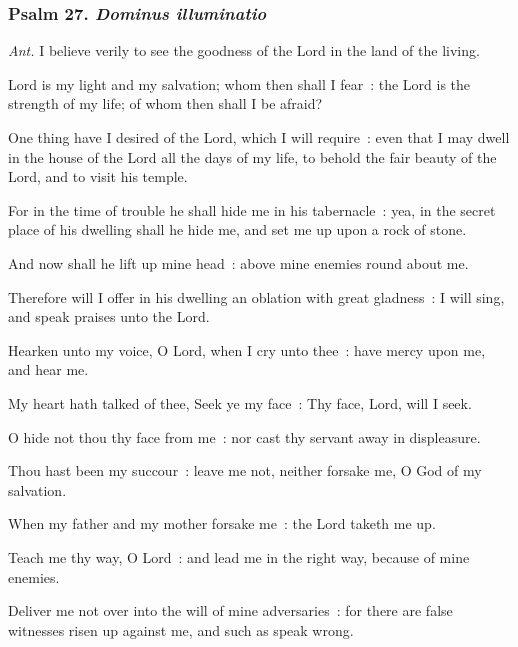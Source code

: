 \subsubsection{Psalm 27. \textit{Dominus illuminatio}}\par\noindent
\textit{Ant.} I believe {\dag} verily to see the goodness of the Lord in the land of the living.\par
{} Lord is my light and my salvation; whom then shall I fear~: the Lord is the strength of my life; of whom then shall I be afraid?\par
{}
One thing have I desired of the Lord, which I will require~: even that I may dwell in the house of the Lord all the days of my life, to behold the fair beauty of the Lord, and to visit his temple.\par
{}For in the time of trouble he shall hide me in his tabernacle~: yea, in the secret place of his dwelling shall he hide me, and set me up upon a rock of stone.\par
{}And now shall he lift up mine head~: above mine enemies round about me.\par
{}Therefore will I offer in his dwelling an oblation with great gladness~: I will sing, and speak praises unto the Lord.\par
{}Hearken unto my voice, O Lord, when I cry unto thee~: have mercy upon me, and hear me.\par
{}My heart hath talked of thee, Seek ye my face~: Thy face, Lord, will I seek.\par
{}O hide not thou thy face from me~: nor cast thy servant away in displeasure.\par
{}Thou hast been my succour~: leave me not, neither forsake me, O God of my salvation.\par
{}When my father and my mother forsake me~: the Lord taketh me up.\par
{}Teach me thy way, O Lord~: and lead me in the right way, because of mine enemies.\par
{}Deliver me not over into the will of mine adversaries~: for there are false witnesses risen up against me, and such as speak wrong.\par
